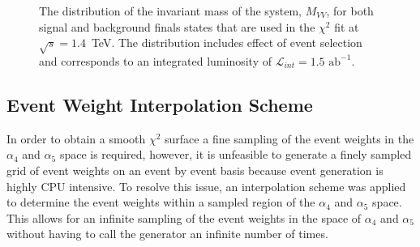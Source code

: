 \begin{figure}[h!]
\centering
{}
\caption[The distribution of the invariant mass of the system, $M_{VV}$, for both signal and background finals states that are used in the $\chi^{2}$ fit at $\sqrt{s}=1.4$~TeV.  The distribution includes effect of event selection and corresponds to an integrated luminosity of $\mathcal{L}_{int} = 1.5\text{ ab}^{-1}$.]{The distribution of the invariant mass of the system, $M_{VV}$, for both signal and background finals states that are used in the $\chi^{2}$ fit at $\sqrt{s}=1.4$~TeV.  The distribution includes effect of event selection and corresponds to an integrated luminosity of $\mathcal{L}_{int} = 1.5\text{ ab}^{-1}$.}
\label{fig:signalbackgroundfit}
\end{figure}


\subsection{Event Weight Interpolation Scheme}
\label{sec:eventweightsinterpolation}
In order to obtain a smooth $\chi^{2}$ surface a fine sampling of the event weights in the $\alpha_{4}$ and $\alpha_{5}$ space is required, however, it is unfeasible to generate a finely sampled grid of event weights on an event by event basis because event generation is highly CPU intensive.  To resolve this issue, an interpolation scheme was applied to determine the event weights within a sampled region of the $\alpha_{4}$ and $\alpha_{5}$ space.  This allows for an infinite sampling of the event weights in the space of $\alpha_{4}$ and $\alpha_{5}$ without having to call the generator an infinite number of times.

